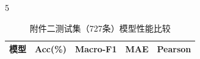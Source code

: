 \begin{PaperTable}{5}

\begin{table}[!htbp]
\centering\caption{附件二测试集（727条）模型性能比较\label{q3-tab5}}
\begin{tabular}{@{}lllll@{}}
\toprule
\begin{minipage}[b]{\dimexpr 0.340000\linewidth-2.720000\tabcolsep\relax}\raggedright
模型\strut
\end{minipage} & \begin{minipage}[b]{\dimexpr 0.160000\linewidth-1.280000\tabcolsep\relax}\raggedleft
Acc(\%)\strut
\end{minipage} & \begin{minipage}[b]{\dimexpr 0.180000\linewidth-1.440000\tabcolsep\relax}\raggedleft
Macro-F1\strut
\end{minipage} & \begin{minipage}[b]{\dimexpr 0.160000\linewidth-1.280000\tabcolsep\relax}\raggedleft
MAE\strut
\end{minipage} & \begin{minipage}[b]{\dimexpr 0.160000\linewidth-1.280000\tabcolsep\relax}\raggedleft
Pearson\strut
\end{minipage}\tabularnewline
\midrule


\end{tabular}
\end{table}
\end{PaperTable}
